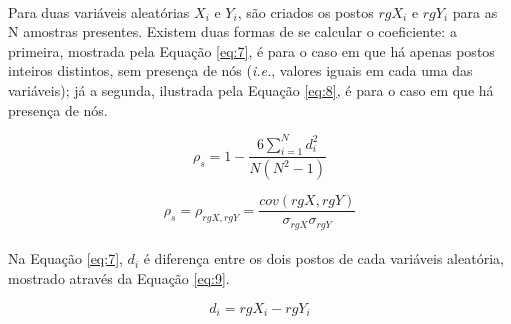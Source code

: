 \paragraph{} Para duas variáveis aleatórias \begin{math}X_i\end{math} e \begin{math}Y_i\end{math}, são criados os postos \begin{math}rgX_i\end{math} e \begin{math}rgY_i\end{math} para as N amostras presentes. Existem duas formas de se calcular o coeficiente: a primeira, mostrada pela Equação \ref{eq:7}, é para o caso em que há apenas postos inteiros distintos, sem presença de nós (\textit{i.e.}, valores iguais em cada uma das variáveis); já a segunda, ilustrada pela Equação \ref{eq:8}, é para o caso em que há presença de nós.

\begin{equation} \label{eq:7}
    \rho_s = 1 - \frac{6\sum_{i=1}^{N}d_i^2}{N(N^2-1)}
\end{equation}

\begin{equation} \label{eq:8}
    \rho_s = \rho_{rgX, rgY} = \frac{cov(rgX, rgY)}{\sigma_{rgX} \sigma_{rgY}}
\end{equation}

\paragraph{} Na Equação \ref{eq:7}, \begin{math}d_i\end{math} é diferença entre os dois postos de cada variáveis aleatória, mostrado através da Equação \ref{eq:9}.

\begin{equation} \label{eq:9}
    d_i = rgX_i - rgY_i
\end{equation}


